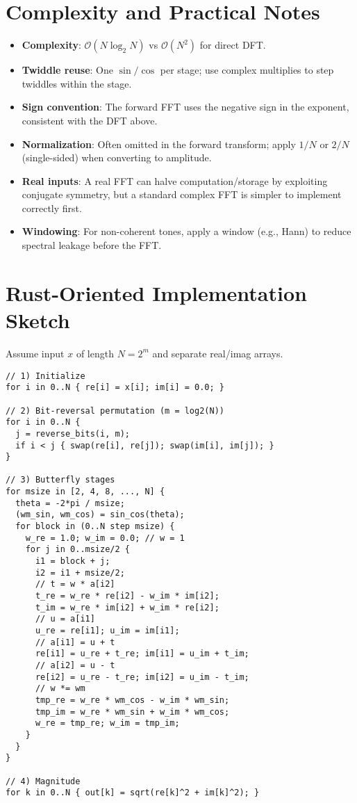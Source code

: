 \documentclass[11pt,a4paper]{article}
\begin{document}
\section{Complexity and Practical Notes}
\begin{itemize}
  \item \textbf{Complexity}: $\mathcal{O}(N \log_2 N)$ vs $\mathcal{O}(N^2)$ for direct DFT.
  \item \textbf{Twiddle reuse}: One $\sin/\cos$ per stage; use complex multiplies to step twiddles within the stage.
  \item \textbf{Sign convention}: The forward FFT uses the negative sign in the exponent, consistent with the DFT above.
  \item \textbf{Normalization}: Often omitted in the forward transform; apply $1/N$ or $2/N$ (single-sided) when converting to amplitude.
  \item \textbf{Real inputs}: A real FFT can halve computation/storage by exploiting conjugate symmetry, but a standard complex FFT is simpler to implement correctly first.
  \item \textbf{Windowing}: For non-coherent tones, apply a window (e.g., Hann) to reduce spectral leakage before the FFT.
\end{itemize}

\section{Rust-Oriented Implementation Sketch}
Assume input $x$ of length $N=2^m$ and separate real/imag arrays.
\begin{verbatim}
// 1) Initialize
for i in 0..N { re[i] = x[i]; im[i] = 0.0; }

// 2) Bit-reversal permutation (m = log2(N))
for i in 0..N {
  j = reverse_bits(i, m);
  if i < j { swap(re[i], re[j]); swap(im[i], im[j]); }
}

// 3) Butterfly stages
for msize in [2, 4, 8, ..., N] {
  theta = -2*pi / msize;
  (wm_sin, wm_cos) = sin_cos(theta);
  for block in (0..N step msize) {
    w_re = 1.0; w_im = 0.0; // w = 1
    for j in 0..msize/2 {
      i1 = block + j;
      i2 = i1 + msize/2;
      // t = w * a[i2]
      t_re = w_re * re[i2] - w_im * im[i2];
      t_im = w_re * im[i2] + w_im * re[i2];
      // u = a[i1]
      u_re = re[i1]; u_im = im[i1];
      // a[i1] = u + t
      re[i1] = u_re + t_re; im[i1] = u_im + t_im;
      // a[i2] = u - t
      re[i2] = u_re - t_re; im[i2] = u_im - t_im;
      // w *= wm
      tmp_re = w_re * wm_cos - w_im * wm_sin;
      tmp_im = w_re * wm_sin + w_im * wm_cos;
      w_re = tmp_re; w_im = tmp_im;
    }
  }
}

// 4) Magnitude
for k in 0..N { out[k] = sqrt(re[k]^2 + im[k]^2); }
\end{verbatim}
\end{document}
